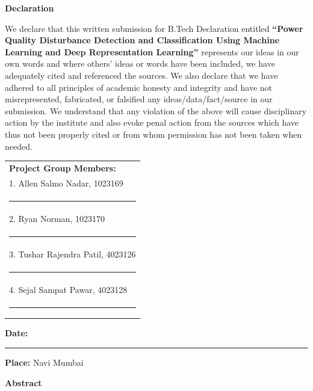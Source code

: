 \documentclass[12pt,a4paper]{report}
\begin{document}
\begin{center}
\vspace*{0.2cm}
{\LARGE\bf Declaration}\\[0.6cm]
\end{center}

\justify
We declare that this written submission for B.Tech Declaration entitled \textbf{``Power Quality Disturbance Detection and Classification Using Machine Learning and Deep Representation Learning''} represents our ideas in our own words and where others' ideas or words have been included, we have adequately cited and referenced the sources. We also declare that we have adhered to all principles of academic honesty and integrity and have not misrepresented, fabricated, or falsified any ideas/data/fact/source in our submission. We understand that any violation of the above will cause disciplinary action by the institute and also evoke penal action from the sources which have thus not been properly cited or from whom permission has not been taken when needed.

\vspace{1.8cm}
\hfill
\begin{tabular}[t]{l@{}}
{\large\textbf{Project Group Members:}} \\[0.6cm]

1. Allen Salmo Nadar, 1023169\\[0.15cm]
\noindent\rule{6cm}{0.4pt} \\[0.7cm]

2. Ryan Norman, 1023170 \\[0.15cm]
\noindent\rule{6cm}{0.4pt} \\[0.7cm]

3. Tushar Rajendra Patil, 4023126 \\[0.15cm]
\noindent\rule{6cm}{0.4pt} \\[0.7cm]

4. Sejal Sampat Pawar, 4023128 \\[0.15cm]
\noindent\rule{6cm}{0.4pt}
\end{tabular}

\vfill
\noindent
\textbf{Date:} \rule{3.5cm}{0.4pt} \hfill \textbf{Place:} Navi Mumbai
\clearpage

\vspace*{0.2cm}
\begin{center}
{\LARGE\bf Abstract}\\[0.4cm]
\end{center}
\end{document}
